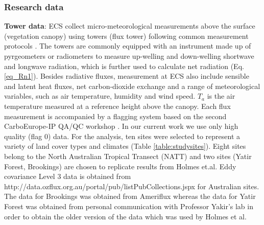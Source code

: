 \documentclass[fleqn,10pt]{wlscirep}
\begin{document}
{{\subsubsection{Research data}
\textbf{Tower data}:
ECS collect micro-meteorological measurements above the surface (vegetation canopy) using towers (flux tower) following common measurement protocols \cite{baldocchi2001fluxnet}. The towers are commonly equipped with an instrument made up of pyrgeometers or radiometers to measure up-welling and down-welling shortwave and longwave radiation, which is further used to calculate net radiation (Eq. \ref{eq_Rn1}). Besides radiative fluxes, measurement at ECS also include sensible and latent heat fluxes, net carbon-dioxide exchange and a range of meteorological variables, such as air temperature, humidity and wind speed. $T_{a}$ is the air temperature measured at a reference height above the canopy. Each flux measurement is accompanied by a flagging system based on the second CarboEurope-IP QA/QC workshop \cite{gilberto2020fluxnet2015}. In our current work we use only high quality (flag 0) data. For the analysis, ten sites were selected to represent a variety of land cover types and climates (Table \ref{table:studysites}). Eight sites belong to the North Australian Tropical Transect (NATT) and two sites (Yatir Forest, Brookings) are chosen to replicate results from Holmes et.al\cite{holmes_land_2009-1}. Eddy covariance Level 3 data is obtained from http://data.ozflux.org.au/portal/pub/listPubCollections.jspx for Australian sites. The data for Brookings was obtained from Ameriflux whereas the data for Yatir Forest was obtained from personal communication with Professor Yakir's lab in order to obtain the older version of the data which was used by Holmes et al.\cite{holmes_land_2009}%

}}
\end{document}
